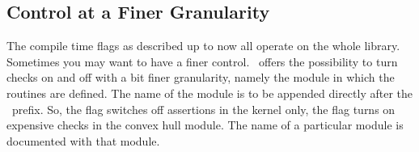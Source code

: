 \ccGlueBegin
{}
\ccGlueEnd

\subsection{Control at a Finer Granularity}

The compile time flags as described up to now all operate on the whole 
library.
Sometimes you may want to have a finer control.
\cgal\ offers the possibility to turn checks on and off with a bit finer
granularity, namely the module in which the routines are defined.
The name of the module is to be appended directly after the \cgal\ prefix.
So, the flag  switches off assertions in 
the kernel only, the flag  turns on
expensive checks in the convex hull module.
The name of a particular module is documented with that module.

